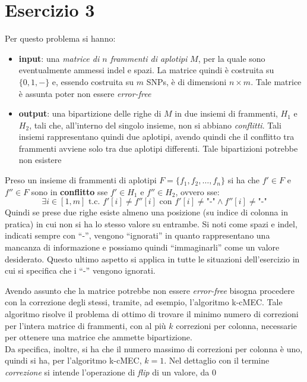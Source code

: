 \documentclass[a4paper,12pt, oneside]{book}
\begin{document}
\chapter{Esercizio 3}
Per questo problema si hanno:
\begin{itemize}
  \item \textbf{input}: una \textit{matrice di $n$ frammenti di aplotipi}
  $M$, per la quale sono eventualmente ammessi indel e spazi. La matrice
  quindi è costruita su $\{0,1,-\}$ e, essendo costruita su $m$ SNPs, è di
  dimensioni $n\times m$. Tale matrice è assunta poter non essere
  \textit{error-free}   
  \item \textbf{output}: una bipartizione delle righe di $M$ in due insiemi di
  frammenti, $H_1$ e $H_2$, tali che, all'interno del singolo insieme, non si
  abbiano \textit{conflitti}. Tali insiemi rappresentano quindi due aplotipi,
  avendo quindi che il conflitto tra frammenti avviene solo tra due aplotipi
  differenti. Tale bipartizioni potrebbe non esistere
\end{itemize}
\begin{definizione}
  Preso un insieme di frammenti di aplotipi $F=\{f_1,f_2,\ldots, f_n\}$ si ha
  che $f'\in F$ e $f''\in F$ sono in \textbf{conflitto} sse $f'\in H_1$ e
  $f''\in H_2$, ovvero sse:
  \[\exists i \in [1,m]\mbox{ t.c. }f'[i]\neq f''[i]\mbox{ con } f'[i]\neq
    \mbox{"-"}\land f''[i]\neq \mbox{"-"}\]
  Quindi se prese due righe esiste almeno una posizione (su indice di colonna in
  pratica) in cui non si ha lo stesso valore su entrambe. Si noti come spazi e
  indel, indicati sempre con 
  ``-'', vengono ``ignorati'' in quanto rappresentano una mancanza di
  informazione e possiamo quindi ``immaginarli'' come un valore
  desiderato. Questo ultimo aspetto si applica in tutte le situazioni 
  dell'esercizio in cui si specifica che i ``-'' vengono ignorati.
\end{definizione}
Avendo assunto che la matrice potrebbe non essere \textit{error-free} bisogna
procedere con la correzione degli stessi, tramite, ad esempio, l'algoritmo
k-cMEC. Tale algoritmo risolve il problema di ottimo di trovare il minimo numero
di correzioni per l'intera matrice di frammenti, con al più $k$ correzioni per
colonna, necessarie per ottenere una matrice che ammette bipartizione.\\
Da specifica, inoltre, si ha che il numero massimo di correzioni per colonna è
uno, quindi si ha, per l'algoritmo k-cMEC, $k=1$. Nel dettaglio con il termine
\textit{correzione} si intende l'operazione di \textit{flip} di un valore, da 0
\end{document}
